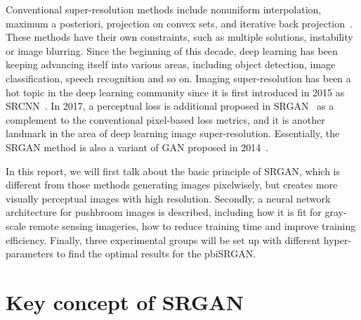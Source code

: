 \documentclass[10pt,twocolumn,letterpaper]{article}
\begin{document}
Conventional super-resolution methods include nonuniform interpolation, maximum a posteriori, projection on convex sets, and iterative back projection~\cite{park2003super}. These  methods have their own constraints, such as multiple solutions, instability or image blurring. Since the beginning of this decade, deep learning has been keeping advancing itself into various areas, including object detection, image classification, speech recognition and so on.  Imaging super-resolution has been a hot topic in the deep learning community since it is first introduced in 2015 as SRCNN~\cite{dong2015image}. In 2017, a perceptual loss is additional proposed in SRGAN~\cite{ledig2017photo} as a complement to the conventional pixel-based loss metrics, and it is another landmark in the area of deep learning image super-resolution. Essentially, the SRGAN method is also a variant of GAN proposed in 2014~\cite{goodfellow2014generative}.

In this report, we will first talk about the basic principle of SRGAN, which is different from those methods generating images pixelwisely, but creates more visually perceptual images with high resolution.  Secondly, a neural network architecture for pushbroom images is described, including how it is fit for gray-scale remote sensing imageries, how to reduce training time and improve training efficiency. Finally, three experimental groups will be set up with different hyper-parameters to find the optimal results for the pbiSRGAN.
\section{Key concept of SRGAN}
\end{document}
